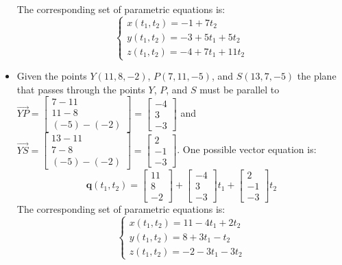 \documentclass{article}
\begin{document}
\begin{itemize}
The corresponding set of parametric equations is: 
\[\left\{\begin{array}{c} x(t_1, t_2) = -1 + 7t_2 \\ y(t_1, t_2) = -3 + 5t_1 + 5t_2 \\ z(t_1, t_2) = -4 + 7t_1 + 11t_2 \end{array}\right.\]
\item Given the points \(Y(11, 8, -2)\), \(P(7, 11, -5)\), and \(S(13, 7, -5)\) the plane that passes through the points \(Y\), \(P\), and \(S\) must be parallel to \(\overrightarrow{YP} = \begin{bmatrix} 7 - 11 \\ 11 - 8 \\ (-5) - (-2) \end{bmatrix} = \begin{bmatrix} -4 \\ 3 \\ -3 \end{bmatrix}\) and \(\overrightarrow{YS} = \begin{bmatrix} 13 - 11 \\ 7 - 8 \\ (-5) - (-2) \end{bmatrix} = \begin{bmatrix} 2 \\ -1 \\ -3 \end{bmatrix}\). One possible vector equation is:
\[\mathbf{q}(t_1, t_2) = \begin{bmatrix} 11 \\ 8 \\ -2 \end{bmatrix} + \begin{bmatrix} -4 \\ 3 \\ -3 \end{bmatrix}t_1 + \begin{bmatrix} 2 \\ -1 \\ -3 \end{bmatrix}t_2\] 
The corresponding set of parametric equations is: 
\[\left\{\begin{array}{c} x(t_1, t_2) = 11 - 4t_1 + 2t_2 \\ y(t_1, t_2) = 8 + 3t_1 - t_2 \\ z(t_1, t_2) = -2 - 3t_1 - 3t_2 \end{array}\right.\]
\end{itemize}
\end{document}
